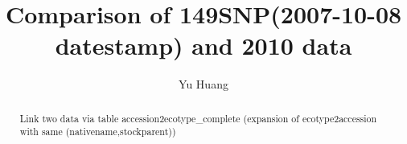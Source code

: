 \documentclass[a3paper,10pt]{article}
\title{Comparison of 149SNP(2007-10-08 datestamp) and 2010 data}
\author{Yu Huang}
\begin{document}
\maketitle

\begin{abstract}
Link two data via table accession2ecotype\_complete (expansion of ecotype2accession with same (nativename,stockparent))

\end{abstract}

\tableofcontents




\end{document}
